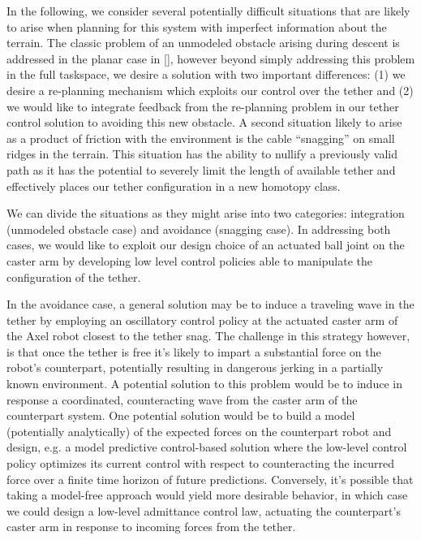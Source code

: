 \documentclass[12pt]{article}
\begin{document}


In the following, we consider several potentially difficult situations that are likely 
to arise when planning for this system with imperfect information about the terrain. The classic problem 
of an unmodeled obstacle arising during descent is addressed in the planar case in \ref{}, however beyond 
simply addressing this problem in the full taskspace, we 
desire a solution with two important differences: (1) we desire a re-planning mechanism which exploits 
our control over the tether and (2) we would like to integrate feedback from the re-planning problem 
in our tether control solution to avoiding this new obstacle. A second situation likely to arise as a product 
of friction with the environment is the cable ``snagging'' on small ridges in the terrain. This situation 
has the ability to nullify a previously valid path as it has the potential to severely limit the length 
of available tether and effectively places our tether configuration in a new homotopy class.

We can divide the situations as they might arise into two categories: integration (unmodeled obstacle case) 
and avoidance (snagging case). In addressing both cases, we would like to exploit our design choice of an 
actuated ball joint on the caster arm by developing low level control policies able to manipulate the 
configuration of the tether. 

In the avoidance case, a general solution may be to induce a traveling wave in the tether by employing 
an oscillatory control policy at the actuated caster arm of the Axel robot closest to the tether snag. 
The challenge in this strategy however, is that once the tether is free it's likely to impart a substantial 
force on the robot's counterpart, potentially resulting in dangerous jerking in a partially known environment. 
A potential solution to this problem would be to induce in response a coordinated, counteracting wave from the caster 
arm of the counterpart system. One potential solution would be to build a model (potentially analytically)
of the expected forces on the counterpart robot and design, e.g. a model predictive control-based solution where 
the low-level control policy optimizes its current control with respect to counteracting the incurred force over 
a finite time horizon of future predictions. Conversely, it's possible that taking a model-free approach would 
yield more desirable behavior, in which case we could design a low-level admittance control law, actuating 
the counterpart's caster arm in response to incoming forces from the tether.
\end{document}

